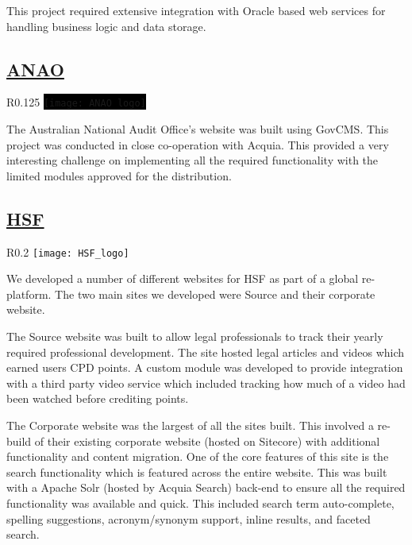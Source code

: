 \documentclass[11pt,a4paper,sans]{moderncv}        %
\begin{document}
    This project required extensive integration with Oracle based web services for handling business logic and data storage.

  \subsection{\href{https://www.anao.gov.au/}{\ac{ANAO}}}
    \begin{wrapfigure}{R}{0.125\textwidth}
      \vspace{-15pt}
      \colorbox{black}{\texttt{[image: ANAO\_logo]}}
      \vspace{-25pt}
    \end{wrapfigure}
    The Australian National Audit Office's website was built using GovCMS\@. This project was conducted in close co-operation with Acquia. This provided a very interesting challenge on implementing all the required functionality with the limited modules approved for the distribution.

  \subsection{\href{https://www.herbertsmithfreehills.com/}{\ac{HSF}}}
    \begin{wrapfigure}{R}{0.2\textwidth}
      \vspace{-10pt}
      \texttt{[image: HSF\_logo]}
      \vspace{-10pt}
    \end{wrapfigure}
    We developed a number of different websites for \ac{HSF} as part of a global re-platform. The two main sites we developed were Source and their corporate website.

    The Source website was built to allow legal professionals to track their yearly required professional development. The site hosted legal articles and videos which earned users \ac{CPD} points. A custom module was developed to provide integration with a third party video service which included tracking how much of a video had been watched before crediting points.

    The Corporate website was the largest of all the sites built. This involved a re-build of their existing corporate website (hosted on Sitecore) with additional functionality and content migration. One of the core features of this site is the search functionality which is featured across the entire website. This was built with a Apache Solr (hosted by Acquia Search) back-end to ensure all the required functionality was available and quick. This included search term auto-complete, spelling suggestions, acronym/synonym support, inline results, and faceted search.
\end{document}
